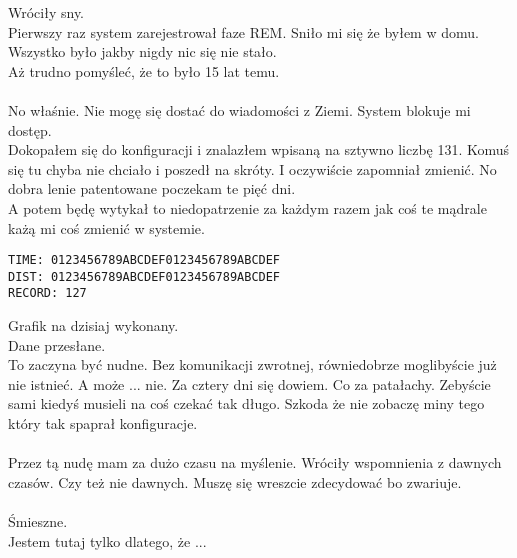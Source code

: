 %
Wróciły sny.\\
Pierwszy raz system zarejestrował faze REM. Sniło mi się że byłem w domu. Wszystko było jakby nigdy nic się nie stało.\\
Aż trudno pomyśleć, że to było 15 lat temu.\\
\\
No właśnie. Nie mogę się dostać do wiadomości z Ziemi. System blokuje mi dostęp.\\
Dokopałem się do konfiguracji i znalazłem wpisaną na sztywno liczbę 131. Komuś się tu chyba nie chciało i poszedł na skróty. I oczywiście zapomniał zmienić. No dobra lenie patentowane poczekam te pięć dni.\\
A potem będę wytykał to niedopatrzenie za każdym razem jak coś te mądrale każą mi coś zmienić w systemie.
%
\begin{verbatim}
TIME: 0123456789ABCDEF0123456789ABCDEF
DIST: 0123456789ABCDEF0123456789ABCDEF
RECORD: 127
\end{verbatim}
Grafik na dzisiaj wykonany.\\
Dane przesłane.\\
To zaczyna być nudne. Bez komunikacji zwrotnej, równiedobrze moglibyście już nie istnieć. A może ... nie. Za cztery dni się dowiem. Co za patałachy. Zebyście sami kiedyś musieli na coś czekać tak długo. Szkoda że nie zobaczę miny tego który tak spaprał konfiguracje.\\
\\
Przez tą nudę mam za dużo czasu na myślenie. Wróciły wspomnienia z dawnych czasów. Czy też nie dawnych. Muszę się wreszcie zdecydować bo zwariuje.\\
\\
Śmieszne.\\
Jestem tutaj tylko dlatego, że ...
